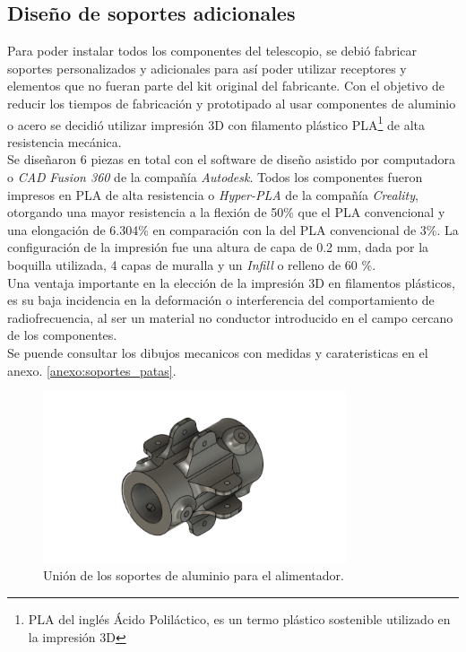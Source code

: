 \subsection{Diseño de soportes adicionales}


Para poder instalar todos los componentes del telescopio, se debió fabricar soportes personalizados y adicionales para así poder utilizar receptores y elementos que no fueran parte del kit original del fabricante. Con el objetivo de reducir los tiempos de fabricación y prototipado al usar componentes de aluminio o acero se decidió utilizar impresión 3D con filamento plástico PLA\footnote{PLA del inglés Ácido Poliláctico, es un termo plástico sostenible utilizado en la impresión 3D} de alta resistencia mecánica.\\

Se diseñaron 6 piezas en total con el software de diseño asistido por computadora o \textit{CAD} \textit{Fusion 360} de la compañía \textit{Autodesk}. Todos los componentes fueron impresos en PLA de alta resistencia o \textit{Hyper-PLA} de la compañía \textit{Creality}, otorgando una mayor resistencia a la flexión de 50\% que el PLA convencional y una elongación de 6.304\% en comparación con la del PLA convencional de 3\%. La configuración de la impresión fue una altura de capa de 0.2 mm, dada por la boquilla utilizada, 4 capas de muralla y un \textit{Infill} o relleno de 60 \%.\\

Una ventaja importante en la elección de la impresión 3D en filamentos plásticos, es su baja incidencia en la deformación o interferencia del comportamiento de radiofrecuencia, al ser un material no conductor introducido en el campo cercano de los componentes.\\

Se puende consultar los dibujos mecanicos con medidas y carateristicas en el anexo. \ref{anexo:soportes_patas}.\\

\begin{figure}
    \centering
    \includegraphics[width=0.8\textwidth]{img/soporte3D5}
    \caption{Unión de los soportes de aluminio para el alimentador.}
    \label{fig:ensamble4}
\end{figure}

